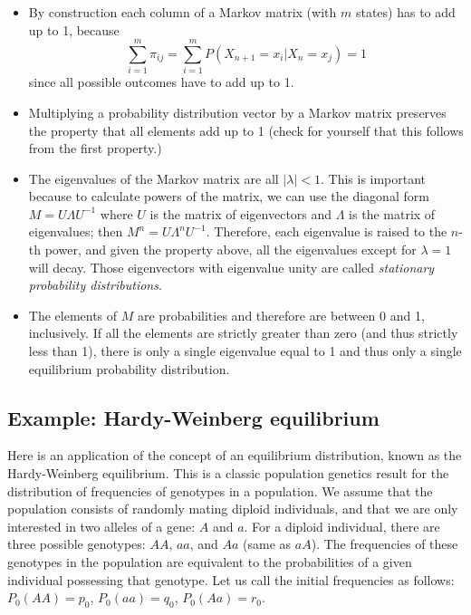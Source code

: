 \documentclass[
  letterpaper,
  DIV=11,
  numbers=noendperiod]{scrreprt}
\providecommand{\tightlist}{%
  \setlength{\itemsep}{0pt}\setlength{\parskip}{0pt}}\usepackage{longtable,booktabs,array}
\begin{document}
\begin{itemize}
\tightlist
\item
  By construction each column of a Markov matrix (with \(m\) states) has
  to add up to 1, because \[
  \sum_{i=1}^{m} \pi_{ij} = \sum_{i=1}^{m} P(X_{n+1} = x_i | X_n = x_j) = 1
  \] since all possible outcomes have to add up to 1.
\item
  Multiplying a probability distribution vector by a Markov matrix
  preserves the property that all elements add up to 1 (check for
  yourself that this follows from the first property.)
\item
  The eigenvalues of the Markov matrix are all \(|\lambda | <1\). This
  is important because to calculate powers of the matrix, we can use the
  diagonal form \(M = U \Lambda U^{-1}\) where \(U\) is the matrix of
  eigenvectors and \(\Lambda\) is the matrix of eigenvalues; then
  \(M^n = U \Lambda^n U^{-1}\). Therefore, each eigenvalue is raised to
  the \(n\)-th power, and given the property above, all the eigenvalues
  except for \(\lambda =1\) will decay. Those eigenvectors with
  eigenvalue unity are called \emph{stationary probability
  distributions}.
\item
  The elements of \(M\) are probabilities and therefore are between 0
  and 1, inclusively. If all the elements are strictly greater than zero
  (and thus strictly less than 1), there is only a single eigenvalue
  equal to 1 and thus only a single equilibrium probability
  distribution.
\end{itemize}

\subsection{Example: Hardy-Weinberg
equilibrium}\label{example-hardy-weinberg-equilibrium}

Here is an application of the concept of an equilibrium distribution,
known as the Hardy-Weinberg equilibrium. This is a classic population
genetics result for the distribution of frequencies of genotypes in a
population. We assume that the population consists of randomly mating
diploid individuals, and that we are only interested in two alleles of a
gene: \(A\) and \(a\). For a diploid individual, there are three
possible genotypes: \(AA\), \(aa\), and \(Aa\) (same as \(aA\)). The
frequencies of these genotypes in the population are equivalent to the
probabilities of a given individual possessing that genotype. Let us
call the initial frequencies as follows: \(P_0(AA) = p_0\),
\(P_0(aa) = q_0\), \(P_0(Aa) = r_0\).
\end{document}
